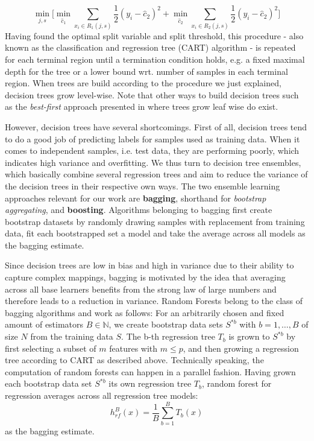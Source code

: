 \begin{equation}\label{minjs}
	\min_{j,s} \bigg [\min_{\hat{c}_1} \sum_{x_i \in R_1(j,s)} \dfrac{1}{2}(y_i - \hat{c}_{2})^2 + \min_{\hat{c}_2} \sum_{x_i \in R_{2}(j,s)} \dfrac{1}{2}(y_i - \hat{c}_{2})^2\bigg]
\end{equation}
Having found the optimal split variable and split threshold, this procedure - also known as the classification and regression tree (CART) algorithm - is repeated for each terminal region until a termination condition holds, e.g. a fixed maximal depth for the tree or a lower bound wrt. number of samples in each terminal region. When trees are build according to the procedure we just explained, decision trees grow level-wise. Note that other ways to build decision trees such as the \textit{best-first} approach presented in \cite{BestFirst} where trees grow leaf wise do exist. 

However, decision trees have several shortcomings. First of all, decision trees tend to do a good job of predicting labels for samples used as training data. When it comes to independent samples, i.e. test data, they are performing poorly, which indicates high variance and overfitting. We thus turn to  decision tree ensembles, which basically combine several regression trees and aim to reduce the variance of the decision trees in their respective own ways. 
The two ensemble learning approaches relevant for our work are \textbf{bagging}, shorthand for \textit{bootstrap aggregating}, and \textbf{boosting}. 
Algorithms belonging to bagging first create bootstrap datasets by randomly drawing samples with replacement from training data, fit each bootstrapped set a model and take the average across all models as the bagging estimate.

Since decision trees are low in bias and high in variance due to their ability to capture complex mappings, bagging is motivated by the idea that averaging across all base learners benefits from the strong law of large numbers and therefore leads to a reduction in variance. 
Random Forests belong to the class of bagging algorithms and work as follows:
For an arbitrarily chosen and fixed amount of estimators $ B \in \mathbb{N}$, we create bootstrap data sets $ S^{*b} $ with $ b = 1, \dots, B $ of size $ N $ from the training data $ S $. The b-th regression tree $ T_b $ is grown to $ S^{*b} $ by first selecting a subset of $ m $ features with $ m \leq p $, and then growing a regression tree according to CART as described above. Technically speaking, the computation of random forests can happen in a parallel fashion.
Having grown each bootstrap data set $ S^{*b} $ its own regression tree $ T_b $, random forest for regression averages across all regression tree models:
\begin{equation}
h^{B}_{rf}(x) = \dfrac{1}{B} \sum_{b=1}^{B} T_b(x)
\end{equation}
as the bagging estimate.


